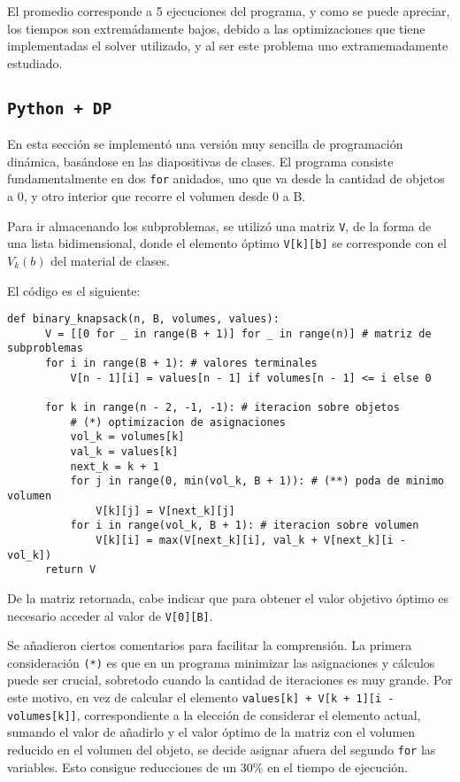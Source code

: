 \documentclass[letterpaper,10pt]{article}
\begin{document}
  El promedio corresponde a 5 ejecuciones del programa, y como se puede apreciar, los tiempos son extremádamente bajos, debido a las optimizaciones que tiene implementadas el solver utilizado, y al ser este problema uno extramemadamente estudiado.

  \subsection{\texttt{Python + DP}}
  
  En esta sección se implementó una versión muy sencilla de programación dinámica, basándose en las diapositivas de clases. El programa consiste fundamentalmente en dos \texttt{for} anidados, uno que va desde la cantidad de objetos a 0, y otro interior que recorre el volumen desde 0 a B.
  
  Para ir almacenando los subproblemas, se utilizó una matriz \texttt{V}, de la forma de una lista bidimensional, donde el elemento óptimo \texttt{V[k][b]} se corresponde con el $V_k(b)$ del material de clases.
  
  El código es el siguiente:

  \begin{lstlisting}[columns=fullflexible]
  def binary_knapsack(n, B, volumes, values):
      V = [[0 for _ in range(B + 1)] for _ in range(n)] # matriz de subproblemas
      for i in range(B + 1): # valores terminales
          V[n - 1][i] = values[n - 1] if volumes[n - 1] <= i else 0

      for k in range(n - 2, -1, -1): # iteracion sobre objetos
          # (*) optimizacion de asignaciones
          vol_k = volumes[k]
          val_k = values[k]
          next_k = k + 1
          for j in range(0, min(vol_k, B + 1)): # (**) poda de minimo volumen
              V[k][j] = V[next_k][j]
          for i in range(vol_k, B + 1): # iteracion sobre volumen
              V[k][i] = max(V[next_k][i], val_k + V[next_k][i - vol_k])
      return V
  \end{lstlisting}
  
  De la matriz retornada, cabe indicar que para obtener el valor objetivo óptimo es necesario acceder al valor de \texttt{V[0][B]}.
  
  Se añadieron ciertos comentarios para facilitar la comprensión. La primera consideración \texttt{(*)} es que en un programa minimizar las asignaciones y cálculos puede ser crucial, sobretodo cuando la cantidad de iteraciones es muy grande. Por este motivo, en vez de calcular el elemento \texttt{values[k] + V[k + 1][i - volumes[k]]}, correspondiente a la elección de considerar el elemento actual, sumando el valor de añadirlo y el valor óptimo de la matriz con el volumen reducido en el volumen del objeto, se decide asignar afuera del segundo \texttt{for} las variables. Esto consigue reducciones de un $30\%$ en el tiempo de ejecución.
  
\end{document}
